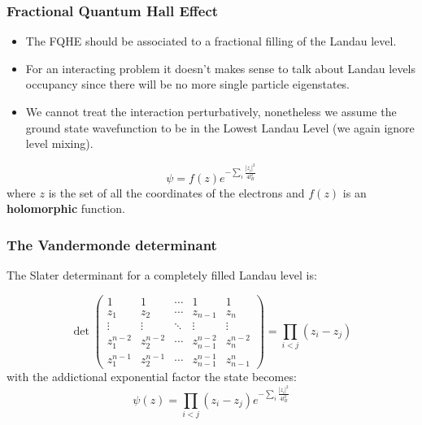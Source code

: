 \documentclass{beamer}
\begin{document}
\begin{frame}
\frametitle{Fractional Quantum Hall Effect}
\begin{center}

\begin{itemize}

\item The FQHE should be associated to a fractional filling of the Landau level.

\item For an interacting problem it doesn't makes sense to talk about Landau levels occupancy since there will be no more single particle eigenstates.

\item We cannot treat the interaction perturbatively, nonetheless we assume the ground state wavefunction to be in the Lowest Landau Level (we again ignore level mixing).
\end{itemize}
\[
\psi = f(z) e^{-\sum_{i} \frac{|z_i|^2}{4 l_B^2}} 
\]
where $z$ is the set of all the coordinates of the electrons and $f(z)$ is an \textbf{holomorphic} function.



\end{center}
\end{frame}

\begin{frame}
\frametitle{The Vandermonde determinant}
\begin{center}

The Slater determinant for a completely filled Landau level is:

\[
\det \begin{pmatrix} 1&1&\cdots & 1 &1\\z_1&z_2&\cdots &z_{n-1}&z_{n}\\\vdots&\vdots&\ddots&\vdots&\vdots\\z_1^{n-2}&z_2^{n-2}&\cdots&z_{n-1}^{n-2}& z_{n}^{n-2}\\z_1^{n-1}&z_2^{n-1}&\cdots&z_{n-1}^{n-1}&z_{n-1}^{n}\end{pmatrix} = \prod_{i < j} \left( z_i - z_j \right)
\]
with the addictional exponential factor the state becomes:
\[
\psi \left( z \right) = \prod_{i < j} \left( z_i - z_j \right) e^{-\sum_{i} \frac{| z_i |^2}{4 l_B^2}}
\]

\end{center}
\end{frame}
\end{document}
